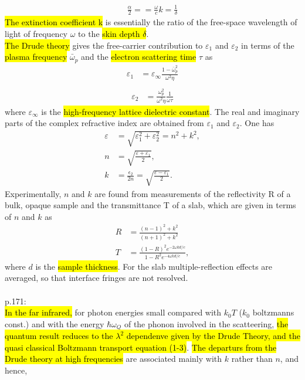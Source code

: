 \begin{align}
   \frac{\alpha}{2} =  = \frac{\omega}{c}k = \frac{1}{\delta}
\end{align}
\hl{The extinction coefficient k} is essentially the ratio of the free-space wavelength of light of 
frequency $\omega$ to the \hl{skin depth $\delta$}.\\
%
\hl{The Drude theory} gives the free-carrier contribution to $\varepsilon_1$ and $\varepsilon_2$ in terms
of the \hl{plasma frequency} $\bar\omega_p$ and the \hl{electron scattering time} $\tau$ as
\begin{align}
   \varepsilon_1 &= \varepsilon_{\infty} \frac{1 - \bar\omega_p^2}{\omega^2 \eta}\\
   \label{eps1Drude}
\end{align}
\begin{align}
   \varepsilon_2 &= \frac{\omega_p^2}{\omega^2 \eta} \frac{ 1 }{ \omega \tau}
\end{align}
where $\varepsilon_{\infty}$ is the \hl{high-frequency lattice dielectric constant}. The real and imaginary
parts of the complex refractive index are obtained from $\varepsilon_1$ and $\varepsilon_2$.
One has
\begin{align}
   \varepsilon &= \sqrt{\varepsilon_1^2 + \varepsilon_2^2} = n^2 + k^2, \\
   n &= \sqrt{\frac{\varepsilon + \varepsilon_1}{2} }, \\
   k &= \frac{\epsilon_2}{2n} = \sqrt{ \frac{\varepsilon - \varepsilon_1}{2}}.
\end{align}
Experimentally, $n$ and $k$ are found from measurements of the reflectivity R of a bulk, opaque sample
and the transmittance T of a slab, which are given in terms of $n$ and $k$ as
\begin{align}
   R &= \frac{(n-1)^2 + k^2}{(n+1)^2 + k^2} \\
   T &= \frac{ (1-R)^2 e^{-2\omega k d / c} }{ 1-R^2 e^{-4\omega k d / c} },
\end{align}
where $d$ is the \hl{sample thickness}. For the slab multiple-reflection effects are averaged,
so that interface fringes are not resolved.
\\
\\
p.171:\\ 
\hl{In the far infrared,} for photon energies small compared with $k_0 T$ ($k_0$ boltzmanns const.)
and with the energy $\hbar \omega_Q$ of the phonon involved in the scatteering,\hl{ the
quantum result reduces to the $\lambda^2$ dependenve given by the Drude Theory, and the quasi classical
Boltzmann transport equation (1-3)}. \hl{The departurs from the Drude theory
at high frequencies} are associated mainly with $k$ rather than $n$, and hence,
